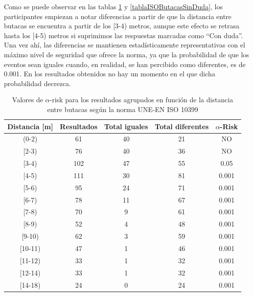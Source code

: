 \documentclass[11pt,a4paper,twoside]{book}
\begin{document}
            Como se puede observar en las tablas \ref{tablaISOButacasDuda} y \ref{tablaISOButacasSinDuda}, los participantes empiezan a notar diferencias a partir de que la distancia entre butacas se encuentra a partir de los [3-4) metros, aunque este efecto se retrasa hasta los [4-5) metros si suprimimos las respuestas marcadas como ``Con duda''. Una vez ahí, las diferencias se mantienen estadísticamente representativas con el máximo nivel de seguridad que ofrece la norma, ya que la probabilidad de que los eventos sean iguales cuando, en realidad, se han percibido como diferentes, es de 0.001. En los resultados obtenidos no hay un momento en el que dicha probabilidad decrezca.\newline
            
            \begin{table}[H]
			\begin{center}
			\begin{scriptsize}
			\begin{tabular}{| c | c | c | c || c |}
			    \hline
				\textbf{Distancia [m]}&\textbf{Resultados}&\textbf{Total iguales}&\textbf{Total diferentes}&\textbf{$\alpha$-Risk}\\ \hline
                (0-2)&61&40&21&NO\\ \hline
                [2-3)&76&40&36&NO\\ \hline
                [3-4)&102&47&55&0.05\\ \hline
                [4-5)&111&30&81&0.001\\ \hline
                [5-6)&95&24&71&0.001\\ \hline
                [6-7)&78&11&67&0.001\\ \hline
                [7-8)&70&9&61&0.001\\ \hline
                [8-9)&52&4&48&0.001\\ \hline
                [9-10)&62&3&59&0.001\\ \hline
                [10-11)&47&1&46&0.001\\ \hline
                [11-12)&33&1&32&0.001\\ \hline
                [12-14)&33&1&32&0.001\\ \hline
                [14-18)&24&0&24&0.001\\ \hline
			\end{tabular}
			\caption{Valores de $\alpha$-risk para los resultados agrupados en función de la distancia entre butacas según la norma UNE-EN ISO 10399}
			\label{tablaISOButacasDuda}
			\end{scriptsize}
			\end{center}	
		    \end{table}
		    
\end{document}
